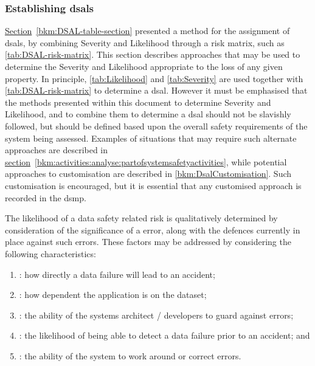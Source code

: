 \subsubsection{Establishing \glspl{dsal}}
\label{bkm:Establishing-DSALS}
\hyperref[bkm:DSAL-table-section]{Section}~\ref{bkm:DSAL-table-section} %
presented a method for the assignment of \gls{dsal}s, by combining Severity and Likelihood through a risk matrix, such as \autoref{tab:DSAL-risk-matrix}. This section describes approaches that may be used to determine the Severity and Likelihood appropriate to the loss of any given property. In principle, \autoref {tab:Likelihood} and \autoref{tab:Severity} are used together with \autoref{tab:DSAL-risk-matrix} to determine a \gls{dsal}. However it must be emphasised that the methods presented within this document to determine Severity and Likelihood, and to combine them to determine a \gls{dsal} should not be slavishly followed, but should be defined based upon the overall safety requirements of the system being assessed. Examples of situations that may require such alternate approaches are described in
\hyperref[bkm:activities:analyse:partofsystemsafetyactivities]{section}~\ref{bkm:activities:analyse:partofsystemsafetyactivities}, %
while potential approaches to customisation are described in \autoref{bkm:DsalCustomisation}.
Such customisation is encouraged, but it is essential that any customised approach is recorded in the \gls{dsmp}.

The likelihood of a data safety related risk is qualitatively determined by
consideration of the significance of a \gls{error}, along with the defences currently in place against such errors. These factors may be addressed by
considering the following characteristics:

\begin{enumerate}
  \item {}: how directly a data failure will lead to an accident;
  \item {}: how dependent the application is on the \gls{dataset};
  \item {}: the ability of the systems architect / developers to guard against \cbstart\glspl{error}\cbend;
  \item {}: the likelihood of being able to detect a data failure prior to an accident; and
  \item {}: the ability of the system to work around or correct \cbstart\glspl{error}\cbend.
\end{enumerate}

